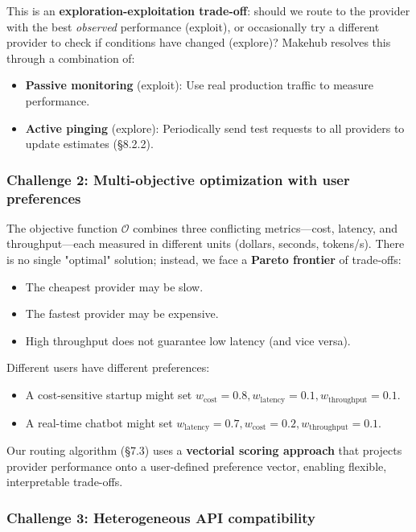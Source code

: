 \documentclass[english]{article}
\begin{document}
This is an \textbf{exploration-exploitation trade-off}: should we route to the provider with the best \emph{observed} performance (exploit), or occasionally try a different provider to check if conditions have changed (explore)? Makehub resolves this through a combination of:
\begin{itemize}
    \item \textbf{Passive monitoring} (exploit): Use real production traffic to measure performance.
    \item \textbf{Active pinging} (explore): Periodically send test requests to all providers to update estimates (§8.2.2).
\end{itemize}

\subsubsection{Challenge 2: Multi-objective optimization with user preferences}

The objective function $\mathcal{O}$ combines three conflicting metrics—cost, latency, and throughput—each measured in different units (dollars, seconds, tokens/s). There is no single "optimal" solution; instead, we face a \textbf{Pareto frontier} of trade-offs:
\begin{itemize}
    \item The cheapest provider may be slow.
    \item The fastest provider may be expensive.
    \item High throughput does not guarantee low latency (and vice versa).
\end{itemize}

Different users have different preferences:
\begin{itemize}
    \item A cost-sensitive startup might set $w_{\text{cost}} = 0.8, w_{\text{latency}} = 0.1, w_{\text{throughput}} = 0.1$.
    \item A real-time chatbot might set $w_{\text{latency}} = 0.7, w_{\text{cost}} = 0.2, w_{\text{throughput}} = 0.1$.
\end{itemize}

Our routing algorithm (§7.3) uses a \textbf{vectorial scoring approach} that projects provider performance onto a user-defined preference vector, enabling flexible, interpretable trade-offs.

\subsubsection{Challenge 3: Heterogeneous API compatibility}
\end{document}
